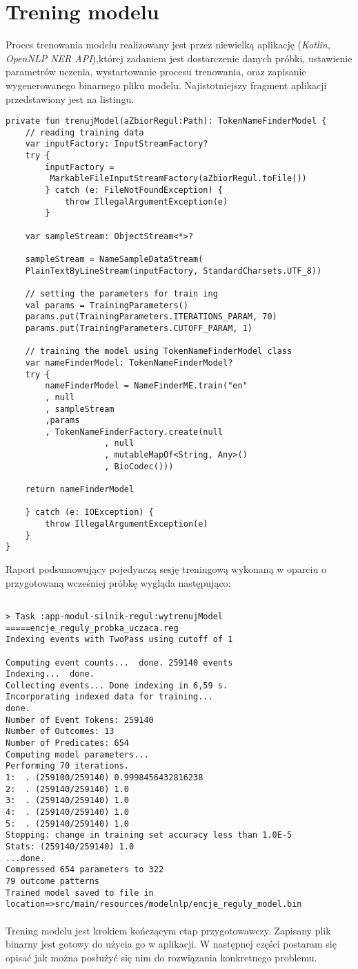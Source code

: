 \section{Trening modelu}

Proces trenowania modelu realizowany jest przez niewielką aplikację (\textit{Kotlin, OpenNLP NER API}),której zadaniem jest dostarczenie danych próbki, ustawienie parametrów uczenia, wystartowanie procesu trenowania, oraz zapisanie wygenerowanego binarnego pliku modelu. Najistotniejszy fragment aplikacji przedstawiony jest na listingu. 
\small
\begin{lstlisting}
private fun trenujModel(aZbiorRegul:Path): TokenNameFinderModel {
	// reading training data
	var inputFactory: InputStreamFactory?
	try {
		inputFactory =
		 MarkableFileInputStreamFactory(aZbiorRegul.toFile())
		} catch (e: FileNotFoundException) {
			throw IllegalArgumentException(e)
		}

	var sampleStream: ObjectStream<*>?

	sampleStream = NameSampleDataStream(
	PlainTextByLineStream(inputFactory, StandardCharsets.UTF_8))

	// setting the parameters for train ing
	val params = TrainingParameters()
	params.put(TrainingParameters.ITERATIONS_PARAM, 70)
	params.put(TrainingParameters.CUTOFF_PARAM, 1)

	// training the model using TokenNameFinderModel class
	var nameFinderModel: TokenNameFinderModel?
	try {
		nameFinderModel = NameFinderME.train("en"
		, null
		, sampleStream
		,params
		, TokenNameFinderFactory.create(null
					, null
					, mutableMapOf<String, Any>()
					, BioCodec()))

	return nameFinderModel

	} catch (e: IOException) {
		throw IllegalArgumentException(e)
	}
}
\end{lstlisting}
	
\normalsize
Raport podsumowujący pojedynczą sesję treningową wykonaną w oparciu o przygotowaną wcześniej próbkę wygląda następująco:

\small
\begin{lstlisting}

> Task :app-modul-silnik-regul:wytrenujModel
=====encje_reguly_probka_uczaca.reg
Indexing events with TwoPass using cutoff of 1

Computing event counts...  done. 259140 events
Indexing...  done.
Collecting events... Done indexing in 6,59 s.
Incorporating indexed data for training...  
done.
Number of Event Tokens: 259140
Number of Outcomes: 13
Number of Predicates: 654
Computing model parameters...
Performing 70 iterations.
1:  . (259100/259140) 0.9998456432816238
2:  . (259140/259140) 1.0
3:  . (259140/259140) 1.0
4:  . (259140/259140) 1.0
5:  . (259140/259140) 1.0
Stopping: change in training set accuracy less than 1.0E-5
Stats: (259140/259140) 1.0
...done.
Compressed 654 parameters to 322
79 outcome patterns
Trained model saved to file in location=>src/main/resources/modelnlp/encje_reguly_model.bin
\end{lstlisting}
\normalsize
\paragraph{}\noindent
Trening modelu jest krokiem kończącym etap przygotowawczy. Zapisany plik binarny jest gotowy do użycia go w aplikacji. W następnej części postaram się opisać jak można posłużyć się nim do rozwiązania konkretnego problemu.